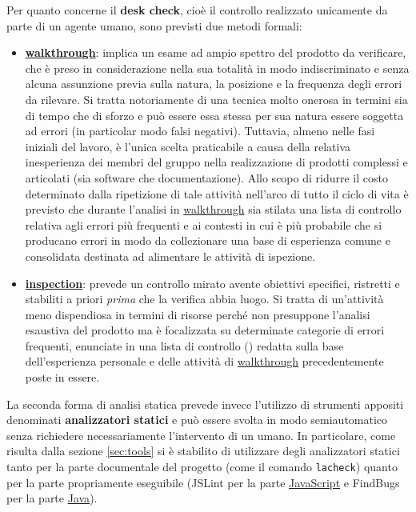 {Per quanto concerne il \textbf{desk check}, cioè il controllo realizzato unicamente da parte di un agente umano, sono previsti due metodi formali:
\begin{itemize}
  \item \textbf{\underline{walkthrough}}: implica un esame ad ampio spettro del prodotto da verificare, che è preso in considerazione nella sua totalità in modo indiscriminato e senza alcuna assunzione previa sulla natura, la posizione e la frequenza degli errori da rilevare. Si tratta notoriamente di una tecnica molto onerosa in termini sia di tempo che di sforzo e può essere essa stessa per sua natura essere soggetta ad errori (in particolar modo falsi negativi). Tuttavia, almeno nelle fasi iniziali del lavoro, è l'unica scelta praticabile a causa della relativa inesperienza dei membri del gruppo nella realizzazione di prodotti complessi e articolati (sia software che documentazione). Allo scopo di ridurre il costo determinato dalla ripetizione di tale attività nell'arco di tutto il ciclo di vita è previsto che durante l'analisi in \underline{walkthrough} sia stilata una lista di controllo relativa agli errori più frequenti e ai contesti in cui è più probabile che si producano errori in modo da collezionare una base di esperienza comune e consolidata destinata ad alimentare le attività di ispezione.
  \item \textbf{\underline{inspection}}: prevede un controllo mirato avente obiettivi specifici, ristretti e stabiliti a priori \emph{prima} che la verifica abbia luogo. Si tratta di un'attività meno dispendiosa in termini di risorse perché non presuppone l'analisi esaustiva del prodotto ma è focalizzata su determinate categorie di errori frequenti, enunciate in una lista di controllo () redatta sulla base dell'esperienza personale e delle attività di \underline{walkthrough} precedentemente poste in essere.
\end{itemize}

La seconda forma di analisi statica prevede invece l'utilizzo di strumenti appositi denominati \textbf{analizzatori statici} e può essere svolta in modo semiautomatico senza richiedere necessariamente l'intervento di un umano. In particolare, come risulta dalla sezione \ref{sec:tools} si è stabilito di utilizzare degli analizzatori statici tanto per la parte documentale del progetto (come il comando \texttt{lacheck}) quanto per la parte propriamente eseguibile (JSLint per la parte \underline{JavaScript} e FindBugs per la parte \underline{Java}).

}
